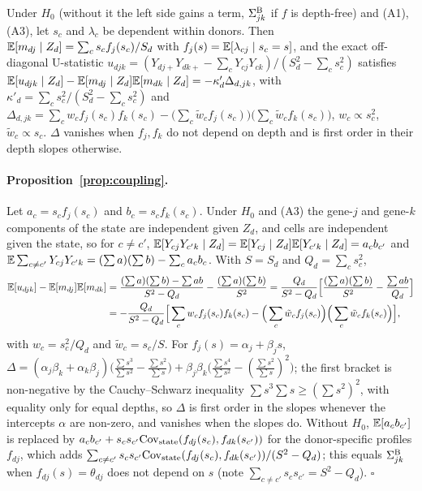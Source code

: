 \begin{proposition}\label{prop:coupling}
Under $H_0$ (without it the left side gains a term, $\Sigma^{\mathrm{B}}_{jk}$ if $f$ is depth-free) and (A1), (A3), let $s_c$ and $\lambda_c$ be dependent within donors. Then $\mathbb{E}[m_{dj}\mid Z_d]=\sum_c s_c f_j(s_c)/S_d$ with $f_j(s)=\mathbb{E}[\lambda_{cj}\mid s_c=s]$, and the exact off-diagonal U-statistic $u_{djk}=(Y_{dj+}Y_{dk+}-\sum_c Y_{cj}Y_{ck})/(S_d^2-\sum_c s_c^2)$ satisfies $\mathbb{E}[u_{djk}\mid Z_d]-\mathbb{E}[m_{dj}\mid Z_d]\mathbb{E}[m_{dk}\mid Z_d]=-\kappa_d'\Delta_{d,jk}$, with $\kappa'_d=\sum_c s_c^2/(S_d^2-\sum_c s_c^2)$ and $\Delta_{d,jk}=\sum_c w_cf_j(s_c)f_k(s_c)-\big(\sum_c \tilde w_cf_j(s_c)\big)\big(\sum_c \tilde w_cf_k(s_c)\big)$, $w_c\propto s_c^2$, $\tilde w_c\propto s_c$. $\Delta$ vanishes when $f_j,f_k$ do not depend on depth and is first order in their depth slopes otherwise.
\end{proposition}

\paragraph{Proposition~\ref{prop:coupling}.} Let $a_c=s_c f_j(s_c)$ and $b_c=s_c f_k(s_c)$. Under $H_0$ and (A3) the gene-$j$ and gene-$k$ components of the state are independent given $Z_d$, and cells are independent given the state, so for $c\neq c'$, $\mathbb{E}[Y_{cj}Y_{c'k}\mid Z_d]=\mathbb{E}[Y_{cj}\mid Z_d]\mathbb{E}[Y_{c'k}\mid Z_d]=a_cb_{c'}$ and $\mathbb{E}\sum_{c\neq c'}Y_{cj}Y_{c'k}=(\sum a)(\sum b)-\sum_c a_cb_c$. With $S=S_d$ and $Q_d=\sum_cs_c^2$,
\begin{align*}
\mathbb{E}[u_{djk}]-\mathbb{E}[m_{dj}]\mathbb{E}[m_{dk}]&=\frac{(\sum a)(\sum b)-\sum ab}{S^2-Q_d}-\frac{(\sum a)(\sum b)}{S^2}=\frac{Q_d}{S^2-Q_d}\Big[\frac{(\sum a)(\sum b)}{S^2}-\frac{\sum ab}{Q_d}\Big]\\
&=-\frac{Q_d}{S^2-Q_d}\Big[\sum_c w_cf_j(s_c)f_k(s_c)-\Big(\sum_c\tilde w_cf_j(s_c)\Big)\Big(\sum_c\tilde w_cf_k(s_c)\Big)\Big],
\end{align*}
with $w_c=s_c^2/Q_d$ and $\tilde w_c=s_c/S$. For $f_j(s)=\alpha_j+\beta_js$, $\Delta=(\alpha_j\beta_k+\alpha_k\beta_j)\big(\tfrac{\sum s^3}{\sum s^2}-\tfrac{\sum s^2}{\sum s}\big)+\beta_j\beta_k\big(\tfrac{\sum s^4}{\sum s^2}-(\tfrac{\sum s^2}{\sum s})^2\big)$; the first bracket is non-negative by the Cauchy--Schwarz inequality $\sum s^3\sum s\ge(\sum s^2)^2$, with equality only for equal depths, so $\Delta$ is first order in the slopes whenever the intercepts $\alpha$ are non-zero, and vanishes when the slopes do. Without $H_0$, $\mathbb{E}[a_cb_{c'}]$ is replaced by $a_cb_{c'}+s_cs_{c'}\mathrm{Cov}_{\text{state}}(f_{dj}(s_c),f_{dk}(s_{c'}))$ for the donor-specific profiles $f_{dj}$, which adds $\sum_{c\neq c'}s_cs_{c'}\mathrm{Cov}_{\text{state}}(f_{dj}(s_c),f_{dk}(s_{c'}))/(S^2-Q_d)$; this equals $\Sigma^{\mathrm{B}}_{jk}$ when $f_{dj}(s)=\theta_{dj}$ does not depend on $s$ (note $\sum_{c\neq c'}s_cs_{c'}=S^2-Q_d$). $\square$

